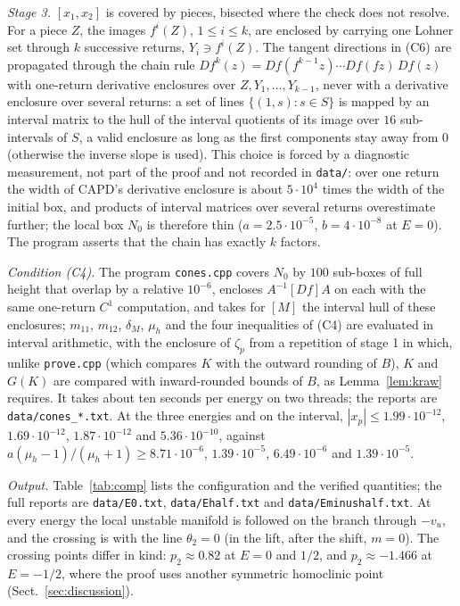 \documentclass[11pt]{article}
\theoremstyle{definition}
\begin{document}
\emph{Stage 3.} $[x_1, x_2]$ is covered by pieces, bisected where the check does not resolve. For a piece $Z$, the images $f^i(Z)$, $1 \le i \le k$, are enclosed by carrying one Lohner set through $k$ successive returns, $Y_i \ni f^i(Z)$. The tangent directions in (C6) are propagated through the chain rule $Df^k(z) = Df(f^{k-1}z)\cdots Df(fz)\,Df(z)$ with one-return derivative enclosures over $Z, Y_1, \ldots, Y_{k-1}$, never with a derivative enclosure over several returns: a set of lines $\{(1, s) : s \in S\}$ is mapped by an interval matrix to the hull of the interval quotients of its image over $16$ sub-intervals of $S$, a valid enclosure as long as the first components stay away from $0$ (otherwise the inverse slope is used). This choice is forced by a diagnostic measurement, not part of the proof and not recorded in \texttt{data/}: over one return the width of CAPD's derivative enclosure is about $5 \cdot 10^{4}$ times the width of the initial box, and products of interval matrices over several returns overestimate further; the local box $N_0$ is therefore thin ($a = 2.5\cdot10^{-5}$, $b = 4\cdot10^{-8}$ at $E = 0$). The program asserts that the chain has exactly $k$ factors.

\emph{Condition (C4).} The program \texttt{cones.cpp} covers $N_0$ by $100$ sub-boxes of full height that overlap by a relative $10^{-6}$, encloses $A^{-1}[Df]A$ on each with the same one-return $C^1$ computation, and takes for $[M]$ the interval hull of these enclosures; $m_{11}$, $m_{12}$, $\delta_M$, $\mu_h$ and the four inequalities of (C4) are evaluated in interval arithmetic, with the enclosure of $\zeta_p$ from a repetition of stage 1 in which, unlike \texttt{prove.cpp} (which compares $K$ with the outward rounding of $B$), $K$ and $G(K)$ are compared with inward-rounded bounds of $B$, as Lemma~\ref{lem:kraw} requires. It takes about ten seconds per energy on two threads; the reports are \texttt{data/cones\_*.txt}. At the three energies and on the interval, $|x_p| \le 1.99\cdot10^{-12}$, $1.69\cdot10^{-12}$, $1.87\cdot10^{-12}$ and $5.36\cdot10^{-10}$, against $a(\mu_h - 1)/(\mu_h + 1) \ge 8.71\cdot10^{-6}$, $1.39\cdot10^{-5}$, $6.49\cdot10^{-6}$ and $1.39\cdot10^{-5}$.

\emph{Output.} Table~\ref{tab:comp} lists the configuration and the verified quantities; the full reports are \texttt{data/E0.txt}, \texttt{data/Ehalf.txt} and \texttt{data/Eminushalf.txt}. At every energy the local unstable manifold is followed on the branch through $-v_u$, and the crossing is with the line $\theta_2 = 0$ (in the lift, after the shift, $m = 0$). The crossing points differ in kind: $p_2 \approx 0.82$ at $E = 0$ and $1/2$, and $p_2 \approx -1.466$ at $E = -1/2$, where the proof uses another symmetric homoclinic point (Sect.~\ref{sec:discussion}).
\end{document}
